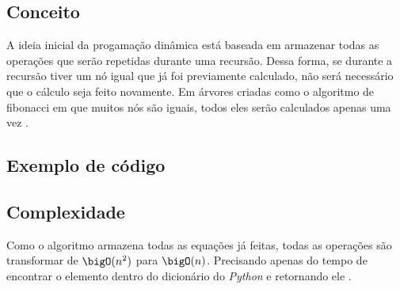 \subsection{Conceito}

A ideia inicial da progamação dinâmica está baseada em armazenar todas
as operações que serão repetidas durante uma recursão. Dessa forma,
se durante a recursão tiver um nó igual que já foi previamente calculado,
não será necessário que o cálculo seja feito novamente. Em árvores criadas
como o algoritmo de fibonacci em que muitos nós são iguais, todos eles
serão calculados apenas uma vez \cite{DynamicProgramming}.

\subsection{Exemplo de código}



\subsection{Complexidade}
Como o algoritmo armazena todas as equações já feitas, todas as operações
são transformar de $\bigO(n^2)$ para $\bigO(n)$. Precisando apenas do
tempo de encontrar o elemento dentro do dicionário do \emph{Python} e retornando
ele \cite{FibonnaciMemoization}.